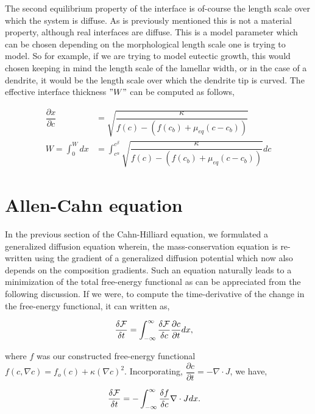 \documentclass[english]{iambook}
\begin{document}
The second equilibrium property of the interface is of-course the 
length scale over which the system is diffuse. As is previously mentioned
this is not a material property, although real interfaces are diffuse.
This is a model parameter which can be chosen depending on the morphological
length scale one is trying to model. So for example, if we are trying to 
model eutectic growth, this would chosen keeping in mind the length scale
of the lamellar width, or in the case of a dendrite, it would be the length
scale over which the dendrite tip is curved. The effective interface thickness
$"W"$ can be computed as follows,

\begin{align}
 \dfrac{\partial x}{\partial c} &= \sqrt{\dfrac{\kappa}{f(c) - \left(f(c_b)  + \mu_{eq}\left(c - c_b\right)\right)}}\\
 W=\int_{0}^{W}dx &= \int_{c^{\alpha}}^{c^{\beta}}\sqrt{\dfrac{\kappa}{f(c) - \left(f(c_b)  + \mu_{eq}\left(c - c_b\right)\right)}}dc
\end{align}

\section{Allen-Cahn equation}
In the previous section of the Cahn-Hilliard equation, we formulated
a generalized diffusion equation wherein, the mass-conservation equation 
is re-written using the gradient of a generalized diffusion potential 
which now also depends on the composition gradients. Such an equation 
naturally leads to a minimization of the total free-energy functional 
as can be appreciated from the following discussion. If we were, to 
compute the time-derivative of the change in the free-energy functional, 
it can written as, 

\begin{align}
 \dfrac{\delta {\cal F}}{\delta t} &= \int_{-\infty}^{\infty} \dfrac{\delta {\cal F}}{\delta c}\dfrac{\partial c}{\partial t}dx,
 \label{time_derivative_free_energy}
\end{align}

where $f$ was our constructed free-energy functional $f\left(c,\nabla c\right)= 
f_o\left(c\right) + \kappa\left(\nabla c\right)^{2}$. Incorporating, 
$\dfrac{\partial c}{\partial t}=-\nabla\cdot J$, we have,

\begin{align}
 \dfrac{\delta {\cal F}}{\delta t} &= -\int_{-\infty}^{\infty} \dfrac{\delta f}{\delta c}\nabla\cdot J dx.
\end{align}
\end{document}
